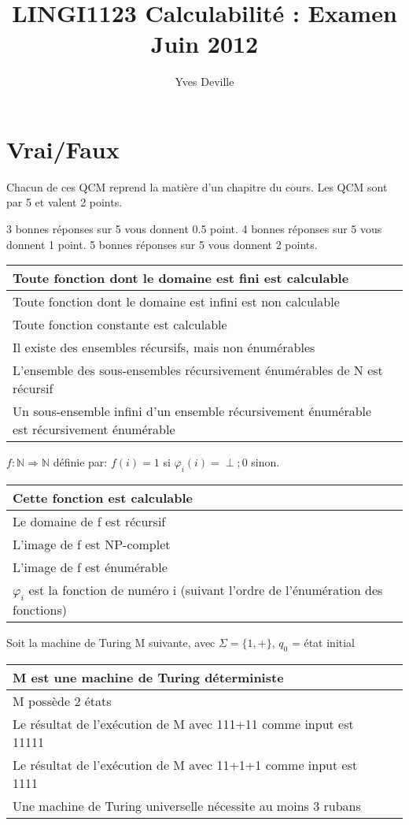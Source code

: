 \documentclass[12pt, a4paper]{article}
\title{LINGI1123 Calculabilité : Examen Juin 2012}
\author{Yves Deville}
\begin{document}
\maketitle

\section{Vrai/Faux}

Chacun de ces QCM reprend la matière d'un chapitre du cours. Les QCM
sont par 5 et valent 2 points.

3 bonnes réponses sur 5 vous donnent 0.5 point.
4 bonnes réponses sur 5 vous donnent 1 point.
5 bonnes réponses sur 5 vous donnent 2 points.

\begin{tabular}{p{13cm}|l}
Toute fonction dont le domaine est fini est calculable & \\ \hline
Toute fonction dont le domaine est infini est non calculable & \\ \hline
Toute fonction constante est calculable & \\ \hline
Il existe des ensembles récursifs, mais non énumérables & \\ \hline
L'ensemble des sous-ensembles récursivement énumérables de N est récursif & \\ \hline
Un sous-ensemble infini d'un ensemble récursivement énumérable est récursivement énumérable & \\ \hline
\end{tabular}
\bigskip

$f: \mathbb{N} \Rightarrow \mathbb{N}$ définie par: $f(i) = 1$ si $\varphi_i(i) = \perp; 0$ sinon.

\begin{tabular}{p{13cm}|l}
Cette fonction est calculable & \\ \hline
Le domaine de f est récursif & \\ \hline
L'image de f est NP-complet & \\ \hline
L'image de f est énumérable & \\ \hline
$\varphi_{i}$ est la fonction de numéro i (suivant l'ordre de l'énumération des fonctions) & \\ \hline
\end{tabular}
\bigskip

Soit la machine de Turing M suivante, avec $\Sigma = \{1, +\}$, $q_{0}$ = état initial

\begin{tabular}{p{13cm}|l}
M est une machine de Turing déterministe & \\ \hline
M possède 2 états & \\ \hline
Le résultat de l'exécution de M avec 111+11 comme input est 11111 & \\ \hline
Le résultat de l'exécution de M avec 11+1+1 comme input est 1111 & \\ \hline
Une machine de Turing universelle nécessite au moins 3 rubans & \\ \hline
\end{tabular}
\bigskip
\end{document}
